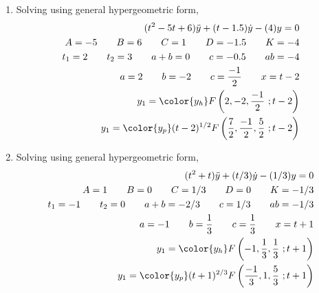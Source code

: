 \begin{enumerate}
    \item Solving using general hypergeometric form,
          \begin{align}
              (t^2 - 5t + 6)\ddot{y} + (t - 1.5) \dot{y} - (4)y = 0                \\
              A = -5 \qquad B = 6 \qquad C = 1 \qquad D = -1.5 \qquad K  = -4      \\
              t_1 = 2 \qquad t_2 = 3 \qquad a+b = 0 \qquad c = -0.5 \qquad ab = -4 \\
              a = 2 \qquad b = -2 \qquad c = \frac{-1}{2} \qquad x = t-2           \\
              y_1 = \color{y_h} F\left( 2, -2, \frac{-1}{2}
              \ ;t-2 \right)                                                       \\
              y_1 = \color{y_p} (t-2)^{1/2} F\left( \frac{7}{2}, \frac{-1}{2},
              \frac{5}{2}\ ;t-2 \right)
          \end{align}

    \item Solving using general hypergeometric form,
          \begin{align}
              (t^2 + t)\ddot{y} + (t/3) \dot{y} - (1/3)y = 0                            \\
              A = 1 \qquad B = 0 \qquad C = 1/3 \qquad D = 0 \qquad K  = -1/3           \\
              t_1 = -1 \qquad t_2 = 0 \qquad a+b = -2/3 \qquad c = 1/3 \qquad ab = -1/3 \\
              a = -1 \qquad b = \frac{1}{3} \qquad c = \frac{1}{3} \qquad x = t+1       \\
              y_1 = \color{y_h} F\left( -1, \frac{1}{3}, \frac{1}{3}
              \ ;t+1 \right)                                                            \\
              y_1 = \color{y_p} (t+1)^{2/3} F\left( \frac{-1}{3}, 1,
              \frac{5}{3}\ ;t+1 \right)
          \end{align}
\end{enumerate}